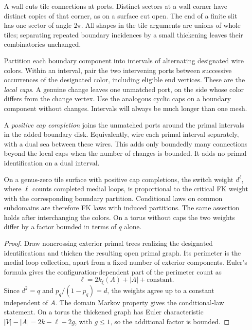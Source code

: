 A wall cuts tile connections at ports. Distinct sectors at a wall corner
have distinct copies of that corner, as on a surface cut open. The end of a
finite slit has one sector of angle $2\pi$. All shapes in the tile arguments
are unions of whole tiles; separating repeated boundary incidences by a
small thickening leaves their combinatorics unchanged.

Partition each boundary component into intervals of alternating designated
wire colors. Within an interval, pair the two intervening ports between
successive occurrences of the designated color, including eligible end
vertices. These are the \emph{local caps}. A genuine change leaves one
unmatched port, on the side whose color differs from the change vertex.
Use the analogous cyclic caps on a boundary component without changes.
Intervals will always be much longer than one mesh.

A \emph{positive cap completion} joins the unmatched ports around the primal
intervals in the added boundary disk. Equivalently, wire each primal
interval separately, with a dual sea between these wires. This adds only
boundedly many connections beyond the local caps when the number of changes
is bounded. It adds no primal identification on a dual interval.

\begin{lemma}\label{prelim:loop-law}
On a genus-zero tile surface with positive cap completions, the switch
weight $d^\ell$, where $\ell$ counts completed medial loops, is proportional
to the critical FK weight with the corresponding boundary partition.
Conditional laws on common subdomains are therefore FK laws with induced
partitions. The same assertion holds after interchanging the colors.
On a torus without caps the two weights differ by a factor bounded in terms
of $q$ alone.
\end{lemma}

\begin{proof}
Draw noncrossing exterior primal trees realizing the designated
identifications and thicken the resulting open primal graph. Its perimeter
is the medial loop collection, apart from a fixed number of exterior
components. Euler's formula gives the configuration-dependent part of the
perimeter count as
\[
 \ell=2k_\xi(A)+|A|+\text{constant}.
\]
Since $d^2=q$ and $p_q/(1-p_q)=d$, the weights agree up to a constant
independent of $A$. The domain Markov property gives the conditional-law
statement. On a torus the thickened graph has Euler characteristic
$|V|-|A|=2k-\ell-2g$, with $g\le1$, so the additional factor is bounded.
\end{proof}
